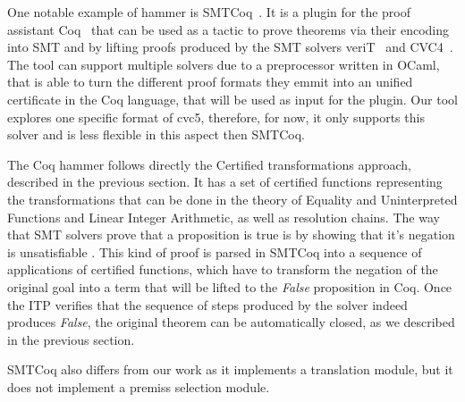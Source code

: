 One notable example of hammer is SMTCoq~\cite{smtcoq}.
It is a plugin for the proof assistant Coq~\cite{Bertot2004} that
can be used as a tactic to prove theorems via their encoding into
SMT and by lifting proofs produced by the SMT solvers veriT~\cite{Bouton2009}
and CVC4~\cite{Barrett2011}. The tool can support multiple solvers
due to a preprocessor written in OCaml, that is able to turn the different
proof formats they emmit into an unified certificate in the Coq language,
that will be used as input for the plugin. Our tool explores one specific
format of cvc5, therefore, for now, it only supports this solver and is
less flexible in this aspect then SMTCoq.

The Coq hammer follows directly the Certified transformations approach, described in
the previous section. It has a set of certified functions representing the transformations
that can be done in the theory of Equality and Uninterpreted Functions and
Linear Integer Arithmetic, as well as resolution chains. The way that SMT solvers prove
that a proposition is true is by showing that it's negation is unsatisfiable
. This kind of proof
is parsed in SMTCoq into a sequence of applications of certified functions, which have
to transform the negation of the original goal into a
term that will be lifted to the \textit{False} proposition in Coq. Once the
ITP verifies that the sequence of steps produced by the solver indeed
produces \textit{False}, the original theorem can be automatically closed,
as we described in the previous section.

SMTCoq also differs from our work as it implements a translation module, but
it does not implement a premiss selection module.
